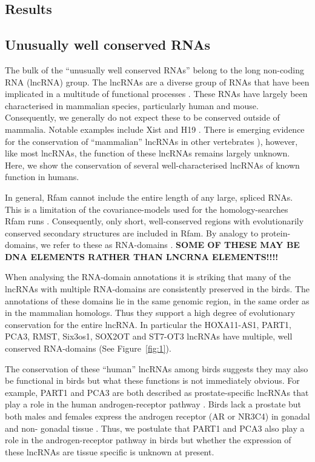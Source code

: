 \documentclass[10pt]{bmc_article}
\newenvironment{bmcformat}{\begin{raggedright}\baselineskip20pt\sloppy\setboolean{publ}{false}}{\end{raggedright}\baselineskip20pt\sloppy}
\begin{document}
\begin{bmcformat}
\section*{Results}


\subsection*{Unusually well conserved RNAs}

The bulk of the ``unusually well conserved RNAs'' belong to the long
non-coding RNA (lncRNA) group.  The lncRNAs are a diverse group of
RNAs that have been implicated in a multitude of functional processes
\cite{Rinn:2007,Chow:2005,Guttman:2009}. These RNAs have largely been
characterised in mammalian species, particularly human and
mouse. Consequently, we generally do not expect these to be conserved
outside of mammalia. Notable examples include Xist \cite{Duret:2006}
and H19 \cite{Smits:2008}.  There is emerging evidence for the
conservation of ``mammalian'' lncRNAs in other vertebrates
\cite{Chodroff:2010,Ulitsky:2011}), however, like most lncRNAs, the
function of these lncRNAs remains largely unknown. Here, we show the
conservation of several well-characterised lncRNAs of known function
in humans. 

In general, Rfam cannot include the entire length of any large,
spliced RNAs. This is a limitation of the covariance-models used for
the homology-searches Rfam runs \cite{Nawrocki:2009}. Consequently,
only short, well-conserved regions with evolutionarily conserved
secondary structures are included in Rfam. By analogy to
protein-domains, we refer to these as RNA-domains
\cite{Burge:2013}. {\bf SOME OF THESE MAY BE DNA ELEMENTS RATHER THAN
  LNCRNA ELEMENTS!!!!}

When analysing the RNA-domain annotations it is striking that many of
the lncRNAs with multiple RNA-domains are consistently preserved in
the birds. The annotations of these domains lie in the same genomic
region, in the same order as in the mammalian homologs. Thus they
support a high degree of evolutionary conservation for the entire
lncRNA. In particular the HOXA11-AS1, PART1, PCA3, RMST, Six3os1, SOX2OT and
ST7-OT3 lncRNAs have multiple, well conserved RNA-domains (See
Figure~\ref{fig:1}).

The conservation of these ``human'' lncRNAs among birds suggests they may 
also be functional in birds but what these
functions is not immediately obvious. For example, PART1 and
PCA3 are both described as prostate-specific lncRNAs that play a role
in the human androgen-receptor pathway
\cite{Bussemakers:1999,Lin:2000,Ferreira:2012}. Birds lack a prostate
but both males and females express the androgen receptor (AR or NR3C4) in gonadal
and non- gonadal tissue
\cite{Yoshimura:1993,Veney:2004,Fuxjager:2012,Leska:2012}. Thus, we
postulate that PART1 and PCA3 also play a role in the
androgen-receptor pathway in birds but whether the expression of these
lncRNAs are tissue specific is unknown at present.


\end{bmcformat}
\end{document}
